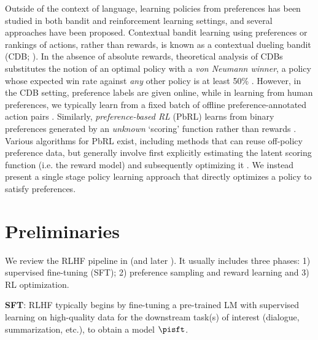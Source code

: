 Outside of the context of language, learning policies from preferences has been studied in both bandit and reinforcement learning settings, and several approaches have been proposed. Contextual bandit learning using preferences or rankings of actions, rather than rewards, is known as a contextual dueling bandit (CDB; \cite{yue2012karmed,dudik2015contextual}). In the absence of absolute rewards, theoretical analysis of CDBs substitutes the notion of an optimal policy with a \textit{von Neumann winner}, a policy whose expected win rate against \textit{any} other policy is at least 50\% \citep{dudik2015contextual}. However, in the CDB setting, preference labels are given online, while in learning from human preferences, we typically learn from a fixed batch of offline preference-annotated action pairs \citep{yan2022human}. Similarly, \textit{preference-based RL} (PbRL) learns from binary preferences generated by an \textit{unknown} `scoring' function rather than rewards \citep{BusaFekete2014,ruiz2023dueling}. Various algorithms for PbRL exist, including methods that can reuse off-policy preference data, but generally involve first explicitly estimating the latent scoring function (i.e. the reward model) and subsequently optimizing it \citep{jain2013learning,BusaFekete2014,christiano2017deep,sadigh2017active,kupcsik2018learning}. We instead present a single stage policy learning approach that directly optimizes a policy to satisfy preferences.

\section{Preliminaries}\label{section:prelims}

We review the RLHF pipeline in \citeauthor{ziegler2020finetuning} (and later \citep{stiennon2022learning, bai2022training, ouyang2022training}). It usually includes three phases: 1) supervised fine-tuning (SFT); 2) preference sampling and reward learning and 3) RL optimization.

\textbf{SFT}: RLHF typically begins by fine-tuning a pre-trained LM with supervised learning on high-quality data for the downstream task(s) of interest (dialogue, summarization, etc.), to obtain a model $\pisft$. 

